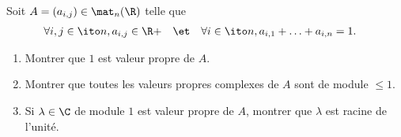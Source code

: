 \begin{enonce}
\begin{exercise}[ID={RMS123 E582, Mines PSI},subtitle={},tags={}]
Soit $A=\left( a_{i,j} \right)\in\mat_n(\R)$ telle que
\begin{align*}
  \forall i,j\in\ito n&, a_{i,j}\in\R+&
  &\et&
  \forall i\in\ito n &, a_{i,1}+\dotsc+a_{i,n}=1.
\end{align*}
\begin{enumerate}
  \item Montrer que $1$ est valeur propre de $A$.
  \item Montrer que toutes les valeurs propres complexes de $A$ sont de module $\leq 1$.
  \item Si $\lambda\in\C$ de module $1$ est valeur propre de $A$, montrer que $\lambda$ est racine de l'unité.
\end{enumerate}
\end{exercise}
\begin{solution}
\end{solution}
\end{enonce}
